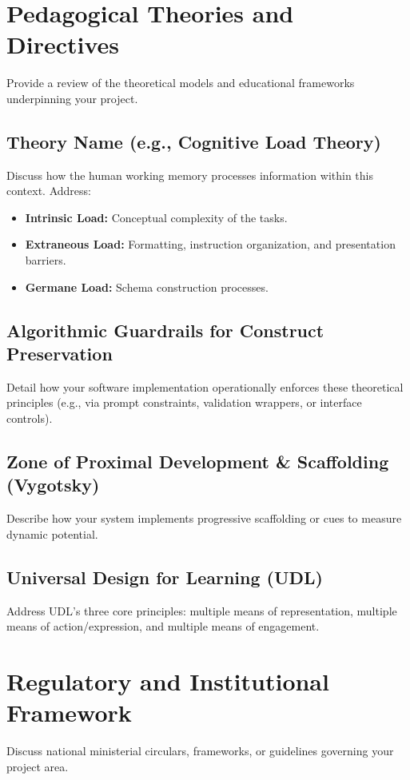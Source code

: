 \documentclass[12pt,a4paper]{report}
\begin{document}
\section{Pedagogical Theories and Directives}
Provide a review of the theoretical models and educational frameworks underpinning your project.

\subsection{Theory Name (e.g., Cognitive Load Theory)}
Discuss how the human working memory processes information within this context. Address:
\begin{itemize}
  \item \textbf{Intrinsic Load:} Conceptual complexity of the tasks.
  \item \textbf{Extraneous Load:} Formatting, instruction organization, and presentation barriers.
  \item \textbf{Germane Load:} Schema construction processes.
\end{itemize}

\subsection{Algorithmic Guardrails for Construct Preservation}
Detail how your software implementation operationally enforces these theoretical principles (e.g., via prompt constraints, validation wrappers, or interface controls).

\subsection{Zone of Proximal Development & Scaffolding (Vygotsky)}
Describe how your system implements progressive scaffolding or cues to measure dynamic potential.

\subsection{Universal Design for Learning (UDL)}
Address UDL's three core principles: multiple means of representation, multiple means of action/expression, and multiple means of engagement.

\section{Regulatory and Institutional Framework}
Discuss national ministerial circulars, frameworks, or guidelines governing your project area.
\end{document}
